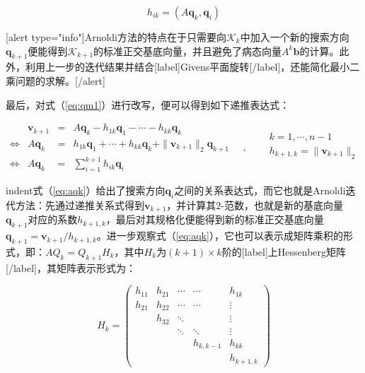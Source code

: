 \documentclass[UTF8,nofonts]{ctexart}
\begin{document}
\[h_{ik}=(A\boldsymbol{q}_k,\boldsymbol{q}_i)\]

[alert type="info"]Arnoldi方法的特点在于只需要向$\mathcal{K}_k$中加入一个新的搜索方向$\boldsymbol{q}_{k+1}$便能得到$\mathcal{K}_{k+1}$的标准正交基底向量，并且避免了病态向量$A^k\boldsymbol{b}$的计算。此外，利用上一步的迭代结果并结合[label]Givens平面旋转[/label]，还能简化最小二乘问题的求解。[/alert]

最后，对式（\ref{eq:qm1}）进行改写，便可以得到如下递推表达式：

\begin{equation}
\label{eq:aqk}
\begin{array}{rrcl}
	& \boldsymbol{v}_{k+1} & = & A\boldsymbol{q}_k-h_{1k}\boldsymbol{q}_1-\cdots-h_{kk}\boldsymbol{q}_k\quad \\
	\Longleftrightarrow & A\boldsymbol{q}_k & = & h_{1k}\boldsymbol{q}_1+\cdots+h_{kk}\boldsymbol{q}_k+\|\boldsymbol{v}_{k+1}\|_2\boldsymbol{q}_{k+1} \\
	\Longleftrightarrow & A\boldsymbol{q}_k & = & \displaystyle \sum_{i=1}^{k+1}h_{ik}\boldsymbol{q}_i
\end{array} \quad,\quad
\begin{aligned}
	& k = 1,\cdots,n-1 \\
	& h_{k+1,k} = \|\boldsymbol{v}_{k+1}\|_2 \\
\end{aligned}
\end{equation}

indent式（\ref{eq:aqk}）给出了搜索方向$\boldsymbol{q}_i$之间的关系表达式，而它也就是Arnoldi迭代方法：先通过递推关系式得到$\boldsymbol{v}_{k+1}$，并计算其$2$-范数，也就是新的基底向量$\boldsymbol{q}_{k+1}$对应的系数$h_{k+1,k}$，最后对其规格化便能得到新的标准正交基底向量$\boldsymbol{q}_{k+1}=\boldsymbol{v}_{k+1}/h_{k+1,k}$。进一步观察式（\ref{eq:aqk}），它也可以表示成矩阵乘积的形式，即：$AQ_k=Q_{k+1}H_k$，其中$H_k$为$(k+1) \times k$阶的[label]上Hessenberg矩阵[/label]，其矩阵表示形式为：

\[
H_k=
\begin{pmatrix}
h_{11} & h_{21} & \cdots & \cdots & h_{1k} \\
h_{21} & h_{22} & \cdots & \cdots & \vdots \\
& h_{32} & \ddots & & \vdots \\
& & \ddots & \ddots & \vdots \\
& & & h_{k,k-1} & h_{kk} \\
& & & & h_{k+1,k}
\end{pmatrix}
\]


\let\oldnl\nl
\newcommand{\nonl}{\renewcommand{\nl}{\let\nl\oldnl}}
\begin{algorithm}[H]
\end{algorithm}
\end{document}
